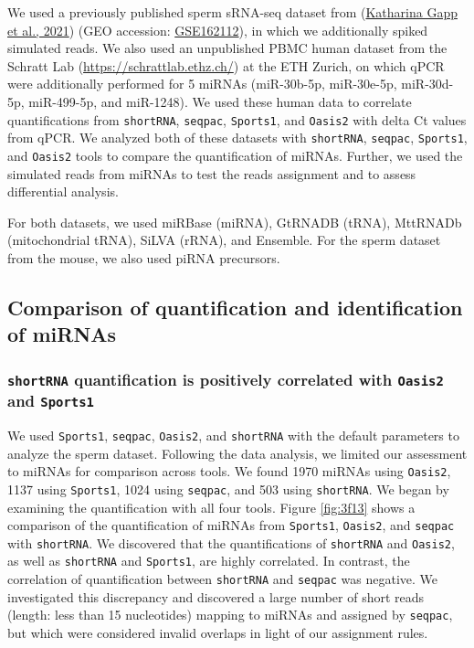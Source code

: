 \documentclass[12pt,twoside]{reedthesis}
\begin{document}
We used a previously published sperm sRNA-seq dataset from (\protect\hyperlink{ref-gapp2021}{Katharina Gapp et al., 2021})
(GEO accession: \href{https://www.ncbi.nlm.nih.gov/geo/query/acc.cgi?acc=GSE162112}{GSE162112}), in which we additionally spiked simulated
reads. We also used an unpublished PBMC human dataset from the Schratt
Lab (\url{https://schrattlab.ethz.ch/}) at the ETH Zurich, on which qPCR
were additionally performed for 5 miRNAs (miR-30b-5p, miR-30e-5p,
miR-30d-5p, miR-499-5p, and miR-1248). We used these human data to
correlate quantifications from \texttt{shortRNA}, \texttt{seqpac}, \texttt{Sports1}, and \texttt{Oasis2}
with delta Ct values from qPCR. We analyzed both of these datasets with
\texttt{shortRNA}, \texttt{seqpac}, \texttt{Sports1}, and \texttt{Oasis2} tools to compare the
quantification of miRNAs. Further, we used the simulated reads from
miRNAs to test the reads assignment and to assess differential analysis.

For both datasets, we used miRBase (miRNA), GtRNADB (tRNA), MttRNADb
(mitochondrial tRNA), SiLVA (rRNA), and Ensemble. For the sperm dataset
from the mouse, we also used piRNA precursors.

\hypertarget{comparison-of-quantification-and-identification-of-mirnas}{%
\subsection{Comparison of quantification and identification of miRNAs}\label{comparison-of-quantification-and-identification-of-mirnas}}

\hypertarget{shortrna-quantification-is-positively-correlated-with-oasis2-and-sports1}{%
\subsubsection{\texorpdfstring{\texttt{shortRNA} quantification is positively correlated with \texttt{Oasis2} and \texttt{Sports1}}{shortRNA quantification is positively correlated with Oasis2 and Sports1}}\label{shortrna-quantification-is-positively-correlated-with-oasis2-and-sports1}}

We used \texttt{Sports1}, \texttt{seqpac}, \texttt{Oasis2}, and \texttt{shortRNA} with the default
parameters to analyze the sperm dataset. Following the data analysis, we
limited our assessment to miRNAs for comparison across tools. We found
1970 miRNAs using \texttt{Oasis2}, 1137 using \texttt{Sports1}, 1024 using \texttt{seqpac}, and 503
using \texttt{shortRNA}. We began by examining the quantification with all four
tools. Figure \ref{fig:3f13} shows a comparison of the quantification of miRNAs from
\texttt{Sports1}, \texttt{Oasis2}, and \texttt{seqpac} with \texttt{shortRNA}. We discovered that the
quantifications of \texttt{shortRNA} and \texttt{Oasis2}, as well as \texttt{shortRNA} and \texttt{Sports1},
are highly correlated. In contrast, the correlation of quantification
between \texttt{shortRNA} and \texttt{seqpac} was negative. We investigated this
discrepancy and discovered a large number of short reads (length: less
than 15 nucleotides) mapping to miRNAs and assigned by \texttt{seqpac}, but which
were considered invalid overlaps in light of our assignment rules.
\end{document}

